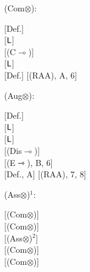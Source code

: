 \documentclass[a4paper,english,fleqn,11pt,final]{scrartcl}
\newcommand{\negg}{{\sim}}
\newcommand{\sfL}{\protect\ensuremath{\mathsf{L}}}
\newcommand{\limp}{\multimap}
\newcommand{\timp}{\rightarrowtriangle}
\newcommand{\tens}{\otimes}
\newcommand{\Deriv}[1]{{\normalfont\textsf{#1}}}
\newcommand{\oland}{\owedge}
\theoremstyle{plain}
\theoremstyle{definition}
\begin{document}
{
\scriptsize



\begin{minipage}[t][][b]{.43\textwidth}
\Deriv{(Com$\tens$)}:

\medskip

{
\setlength{\fitchprfwidth}{1.2in}
\fitchprf{
\pline[A ]{\varphi \tens \psi}
}
{
	\subproof{
	\pline[1 ]{\negg(\psi\tens\varphi)}
	}
	{
		\pline[2 ]{\negg\negg(\psi \limp \negg \varphi)}[Def.]\\
		\pline[3 ]{\psi \limp \negg \varphi}[$\sfL$]\\
		\pline[4 ]{\varphi \limp \negg \psi}[\Deriv{(C$\limp$)}]\\
		\pline[5 ]{\negg\negg(\varphi\limp\negg\psi)}[$\sfL$]\\
		\pline[6 ]{\negg(\varphi\tens\psi)}[Def.]
	}
	\pline[\slider]{\psi \tens \varphi}[\Deriv{(RAA)}, A, 6]
}
}
\end{minipage}
\begin{minipage}[t][][b]{.49\textwidth}
\Deriv{(Aug$\tens$)}:

\medskip

{
	\setlength{\fitchprfwidth}{1.6in}
\fitchprf{
\pline[A ]{\varphi\tens\psi}\\
\pline[B ]{\varphi \limp \vartheta}
}
{
 	\subproof{
		\pline[1 ]{\negg(\varphi \tens (\psi \oland \vartheta))}
	}
	{
		\pline[2 ]{\negg\negg(\varphi\limp \negg (\psi \oland \vartheta))}[Def.]\\
		\pline[3 ]{\varphi \limp \negg(\psi \oland \vartheta)}[$\sfL$]\\
		\pline[4 ]{\varphi \limp (\vartheta \timp \negg\psi )}[$\sfL$]\\
		\pline[6 ]{(\varphi \limp \vartheta) \timp (\varphi \limp \negg\psi)}[\Deriv{(Dis$\limp$)}]\\
		\pline[7 ]{\varphi \limp\negg \psi}[\Deriv{(E$\timp$)}, B, 6]\\
		\pline[8 ]{\negg(\varphi \limp \negg \psi)}[Def., A]
	}
	\pline[\slider]{\varphi \tens (\psi \oland \vartheta)}[\Deriv{(RAA)}, 7, 8]
}
}
\end{minipage}


\bigskip

\begin{minipage}[t][][b]{.43\textwidth}

\Deriv{(Ass$\tens$)$^1$}:

\medskip

{
\setlength{\fitchprfwidth}{1.2in}
\fitchprf{
\pline[A ]{(\varphi\tens\psi)\tens\vartheta)}
}
{
	\pline[1 ]{\vartheta \tens (\varphi \tens\psi)}[\Deriv{(Com$\tens$)}]\\
	\pline[2 ]{\vartheta \tens (\psi \tens \varphi)}[\Deriv{(Com$\tens$)}]\\
	\pline[3 ]{(\vartheta \tens \psi) \tens \varphi}[\Deriv{(Ass$\tens$)}$^2$]\\
	\pline[4 ]{\varphi \tens (\vartheta \tens \psi)}[\Deriv{(Com$\tens$)}]\\
	\pline[\slider]{\varphi \tens (\psi \tens \vartheta)}[\Deriv{(Com$\tens$)}]
}
}
\end{minipage}
\begin{minipage}[t][][b]{.46\textwidth}


\end{minipage}}
\end{document}
